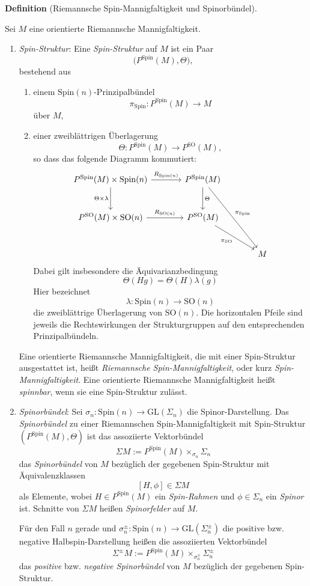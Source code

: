 \documentclass[10pt, letterpaper]{article}
\newcommand{\GL}{\mathrm{GL}}
\newcommand{\SO}{\mathrm{SO}}
\newcommand{\Spin}{\mathrm{Spin}}
\newcommand{\CustomHeading}[3]{%
  \par\medskip\noindent%
  \textbf{#1 #2} \textnormal{(#3)}.\enskip%
}
\newenvironment{DEF}[2]{\CustomHeading{Definition}{#1}{#2}}{}
\begin{document}
\begin{DEF}{}{Riemannsche Spin-Mannigfaltigkeit und Spinorbündel}
Sei \(M\) eine orientierte Riemannsche Mannigfaltigkeit. 

\begin{enumerate}

\item \emph{Spin-Struktur}: Eine \emph{Spin-Struktur}
auf \(M\) ist ein Paar
\[
\bigl(P^{\Spin}(M),\Theta\bigr),
\]
bestehend aus
\begin{enumerate}
    \item einem \(\Spin(n)\)-Prinzipalbündel
    \[
    \pi_{\Spin}:P^{\Spin}(M)\to M
    \]
    über \(M\),
    \item einer zweiblättrigen Überlagerung
    \[
    \Theta:P^{\Spin}(M)\to P^{\SO}(M),
    \]
    so dass das folgende Diagramm kommutiert:
    \[
    \begin{tikzcd}[column sep=large, row sep=large]
    P^{\Spin}(M)\times \Spin(n) \arrow[r,"R_{\Spin(n)}"] \arrow[d,"\Theta\times \lambda"'] &
    P^{\Spin}(M) \arrow[rdd,"\pi_{\Spin}"] \arrow[d,"\Theta"] & \\
    P^{\SO}(M)\times \SO(n) \arrow[r,"R_{\SO(n)}"] &
    P^{\SO}(M) \arrow[rd,"\pi_{\SO}"'] & \\
    & & M
    \end{tikzcd}
    \]
    Dabei gilt insbesondere die Äquivarianzbedingung
    $$\Theta(Hg)=\Theta(H)\lambda(g)$$
    Hier bezeichnet
    \[
    \lambda:\Spin(n)\to \SO(n)
    \]
    die zweiblättrige Überlagerung von \(\SO(n)\). Die horizontalen Pfeile sind
    jeweils die Rechtswirkungen der Strukturgruppen auf den entsprechenden
    Prinzipalbündeln.
\end{enumerate}

Eine orientierte Riemannsche Mannigfaltigkeit, die mit einer Spin-Struktur
ausgestattet ist, heißt \emph{Riemannsche Spin-Mannigfaltigkeit}, oder kurz \emph{Spin-Mannigfaltigkeit}. Eine orientierte Riemannsche Mannigfaltigkeit heißt \emph{spinnbar}, wenn sie eine Spin-Struktur zulässt.

\item \emph{Spinorbündel}: Sei $\sigma_n:\Spin(n)\to \GL(\Sigma_n)$ die Spinor-Darstellung. Das \emph{Spinorbündel} zu einer Riemannschen Spin-Mannigfaltigkeit mit Spin-Struktur $(P^\Spin(M),\Theta)$ ist das assoziierte Vektorbündel
\[
\Sigma M:=P^{\Spin}(M)\times_{\sigma_n}\Sigma_n
\]
das \emph{Spinorbündel} von \(M\) bezüglich der gegebenen Spin-Struktur mit Äquivalenzklassen 
$$[H,\phi]\in\Sigma M$$
als Elemente, wobei $H\in P^{\Spin}(M)$ ein \emph{Spin-Rahmen} und $\phi\in \Sigma_n$ ein \emph{Spinor} ist. Schnitte von \(\Sigma M\) heißen \emph{Spinorfelder} auf \(M\).

Für den Fall \(n\) gerade und $\sigma_n^\pm:\Spin(n)\to \GL(\Sigma_n^\pm)$
die positive bzw. negative Halbspin-Darstellung heißen die assoziierten
Vektorbündel
\[
\Sigma^\pm M:=P^{\Spin}(M)\times_{\sigma_n^\pm}\Sigma_n^\pm
\]
das \emph{positive} bzw. \emph{negative Spinorbündel} von \(M\) bezüglich der
gegebenen Spin-Struktur.

\end{enumerate}

\end{DEF}
\end{document}
